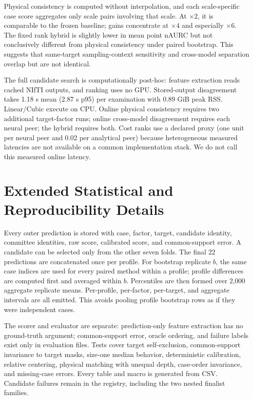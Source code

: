 \documentclass{article}
\begin{document}
Physical consistency is computed without interpolation, and each scale-specific case score aggregates only scale pairs involving that scale. At $\times2$, it is comparable to the frozen baseline; gains concentrate at $\times4$ and especially $\times6$. The fixed rank hybrid is slightly lower in mean point nAURC but not conclusively different from physical consistency under paired bootstrap. This suggests that same-target sampling-context sensitivity and cross-model separation overlap but are not identical.

\begin{table}[!t]
 \centering
 \caption{Frozen retrospective transfer analyses. These are not described as untouched tests because all cohorts had been examined previously.}
 \resizebox{0.90\textwidth}{!}{}
 \label{tab:transfer-full}
\end{table}

The full candidate search is computationally post-hoc: feature extraction reads cached NIfTI outputs, and ranking uses no GPU. Stored-output disagreement takes 1.18 s mean (2.87 s p95) per examination with 0.89 GiB peak RSS. Linear/Cubic execute on CPU. Online physical consistency requires two additional target-factor runs; online cross-model disagreement requires each neural peer; the hybrid requires both. Cost ranks use a declared proxy (one unit per neural peer and 0.02 per analytical peer) because heterogeneous measured latencies are not available on a common implementation stack. We do not call this measured online latency.

\section{Extended Statistical and Reproducibility Details}
Every outer prediction is stored with case, factor, target, candidate identity, committee identities, raw score, calibrated score, and common-support error. A candidate can be selected only from the other seven folds. The final 22 predictions are concatenated once per profile. For bootstrap replicate $b$, the same case indices are used for every paired method within a profile; profile differences are computed first and averaged within $b$. Percentiles are then formed over 2,000 aggregate replicate means. Per-profile, per-factor, per-target, and aggregate intervals are all emitted. This avoids pooling profile bootstrap rows as if they were independent cases.

The scorer and evaluator are separate: prediction-only feature extraction has no ground-truth argument; common-support error, oracle ordering, and failure labels exist only in evaluation files. Tests cover target self-exclusion, common-support invariance to target masks, size-one median behavior, deterministic calibration, relative centering, physical matching with unequal depth, case-order invariance, and missing-case errors. Every table and macro is generated from CSV. Candidate failures remain in the registry, including the two nested finalist families.
\end{document}
